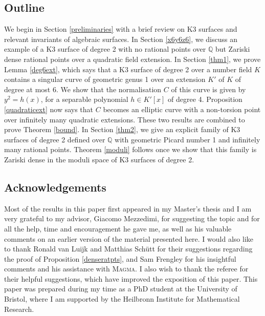 \documentclass[11pt]{amsart}
\newcommand{\QQ}{\mathbb{Q}}
\theoremstyle{plain}
\theoremstyle{remark}
\begin{document}
\subsection{Outline}
We begin in Section \ref{preliminaries} with a brief review on K3 surfaces and relevant invariants of algebraic surfaces. In Section \ref{x6y6z6}, we discuss an example of a K3 surface of degree 2 with no rational points over $\QQ$ but Zariski dense rational points over a quadratic field extension. 
In Section \ref{thm1}, we prove Lemma \ref{deg6ext}, which says that a K3 surface of degree 2 over a number field $K$ contains a singular curve of geometric genus 1 over an extension $K'$ of $K$ of degree at most 6. We show that the normalisation $C$ of this curve is given by $y^2=h(x)$, for a separable polynomial $h\in K'[x]$ of degree 4. Proposition \ref{quadraticext} now says that $C$ becomes an elliptic curve with a non-torsion point over infinitely many quadratic extensions. These two results are combined to prove Theorem \ref{bound}. In Section \ref{thm2}, we give an explicit family of K3 surfaces of degree 2 defined over $\QQ$ with geometric Picard number 1 and infinitely many rational points. Theorem \ref{moduli} follows once we show that this family is Zariski dense in the moduli space of K3 surfaces of degree 2. 


\subsection*{Acknowledgements} Most of the results in this paper first appeared in my Master's thesis and I am very grateful to my advisor, Giacomo Mezzedimi, for suggesting the topic and for all the help, time and encouragement he gave me, as well as his valuable comments on an earlier version of the material presented here. I would also like to thank Ronald van Luijk and Matthias Schütt for their suggestions regarding the proof of Proposition \ref{denseratpts}, and Sam Frengley for his insightful comments and his assistance with \textsc{Magma}. I also wish to thank the referee for their helpful suggestions, which have improved the exposition of this paper. This paper was prepared during my time as a PhD student at the University of Bristol, where I am supported by the Heilbronn Institute for Mathematical Research. 
\end{document}
